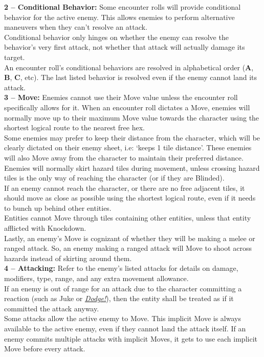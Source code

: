 \documentclass[12pt]{article}
\newcommand{\reftoit}[1]{\hyperlink{#1}{\emph{#1}}}
\begin{document}
\begin{multicols*}{2}
\textbf{2 -- Conditional Behavior:} 
Some encounter rolls will provide conditional behavior for the active enemy. This allows enemies to perform alternative maneuvers when they can’t resolve an attack.\\
Conditional behavior only hinges on whether the enemy can resolve the behavior’s very first attack, not whether that attack will actually damage its target.\\
An encounter roll’s conditional behaviors are resolved in alphabetical order (\textbf{A}, \textbf{B}, \textbf{C}, etc). The last listed behavior is resolved even if the enemy cannot land its attack.\\

\textbf{3 -- Move:} Enemies cannot use their Move value unless the encounter roll specifically allows for it. When an encounter roll dictates a Move, enemies will normally move up to their maximum Move value towards the character using the shortest logical route to the nearest free hex.\\
Some enemies may prefer to keep their distance from the character, which will be clearly dictated on their enemy sheet, i.e: ‘keeps 1 tile distance’. These enemies will also Move away from the character to maintain their preferred distance.\\
Enemies will normally skirt hazard tiles during movement, unless crossing hazard tiles is the only way of reaching the character (or if they are Blinded).\\
If an enemy cannot reach the character, or there are no free adjacent tiles, it should move as close as possible using the shortest logical route, even if it needs to bunch up behind other entities.\\ 
Entities cannot Move through tiles containing other entities, unless that entity afflicted with Knockdown.\\
Lastly, an enemy’s Move is cognizant of whether they will be making a melee or ranged attack. So, an enemy making a ranged attack will Move to shoot across hazards instead of skirting around them.\\

\textbf{4 -- Attacking:} Refer to the enemy’s listed attacks for details on damage, modifiers, type, range, and any extra movement allowance.\\
If an enemy is out of range for an attack due to the character committing a reaction (such as Juke or \reftoit{Dodge!}), then the entity shall be treated as if it committed the attack anyway.\\
Some attacks allow the active enemy to Move. This implicit Move is always available to the active enemy, even if they cannot land the attack itself. If an enemy commits multiple attacks with implicit Moves, it gets to use each implicit Move before every attack.\\


\end{multicols*}
\end{document}

